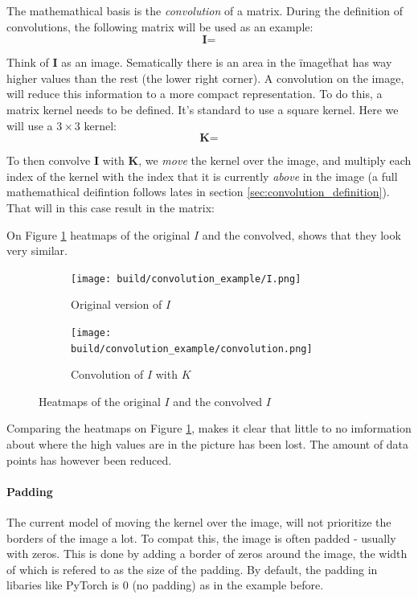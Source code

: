 \documentclass[11pt,a4paper]{article}
\newcommand{\bm}[1]{\textbf{#1}}
\newcommand{\matsym}[1]{\bm{#1}}
\begin{document}
The mathemathical basis is the \textit{convolution} of a matrix.
During the definition of convolutions, the following matrix will be used as an example:
\begin{equation}
    \matsym{I} = 
\end{equation}

Think of $\matsym{I}$ as an image.
Sematically there is an area in the \"image\" that has way higher values than the rest
(the lower right corner).
A convolution on the image, will reduce this information to a more compact representation.
To do this, a matrix kernel needs to be defined. It's standard to use a square kernel.
Here we will use a $3 \times 3$ kernel:
\begin{equation}
    \matsym{K} = 
        
\end{equation}

To then convolve $\matsym{I}$ with $\matsym{K}$, we \textit{move} the kernel over the image,
and multiply each index of the kernel with the index that it is currently \textit{above} in the image
(a full mathemathical deifintion follows lates in section \ref{sec:convolution_definition}).
That will in this case result in the matrix:
\begin{equation}
    
\end{equation}


On Figure \ref{fig:convolution_example} heatmaps of the original $I$ and the convolved, shows that they look very similar.
\begin{figure}[h]
\centering
\begin{subfigure}{0.45\textwidth}
    \texttt{[image: build/convolution\_example/I.png]}
    \caption{Original version of $I$}
\end{subfigure}
\begin{subfigure}{0.45\textwidth}
    \texttt{[image: build/convolution\_example/convolution.png]}
    \caption{Convolution of $I$ with $K$}
\end{subfigure}
\caption{Heatmaps of the original $I$ and the convolved $I$}
\label{fig:convolution_example}
\end{figure}

Comparing the heatmaps on Figure \ref{fig:convolution_example}, makes it clear that little to no imformation about
where the high values are in the picture has been lost.
The amount of data points has however been reduced.

\paragraph{Padding}
The current model of moving the kernel over the image, will not prioritize the borders
of the image a lot. 
To compat this, the image is often padded - usually with zeros. 
This is done by adding a border of zeros around the image, the width of which is refered to as the size of the padding.
By default, the padding in libaries like PyTorch \cite{PyTorch} is $0$ (no padding) as in the example before.
\end{document}

